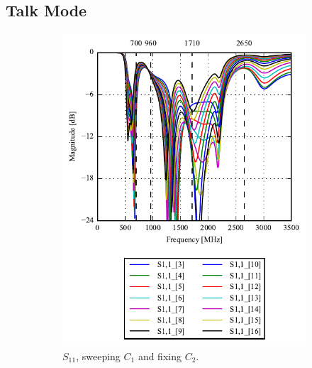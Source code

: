 \subsection{Talk Mode}
\begin{figure}[htbp]
   \begin{subfigure}[b]{0.49\linewidth}
        \centering
        \includegraphics{img/tech_sol/monopole/talk_mode/s11}
        \caption{$S_{11}$, sweeping $C_1$ and fixing $C_2$.}
        \label{fig:ant1_s11}
    \end{subfigure}
    \hfill
    \begin{subfigure}[b]{0.49\linewidth}
        \centering

\end{subfigure}
\end{figure}
